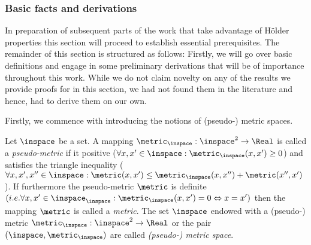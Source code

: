 


\subsubsection{Basic facts and derivations}
In preparation of subsequent parts of the work that take advantage of H\"older properties this section will proceed to establish essential prerequisites.
The remainder of this section is structured as follows: Firstly, we will go over basic definitions and engage in some preliminary derivations that will be of importance throughout this work.
While we do not claim novelty on any of the results we provide proofs for in this section, we had not found them in the literature and hence, had to derive them on our own.

Firstly, we commence with introducing the notions of (pseudo-) metric spaces.

\begin{defn}
Let $\inspace$ be a set. A mapping $\metric_\inspace: \inspace^2 \to \Real$ is called a \emph{pseudo-metric} if it positive ($\forall x,x' \in \inspace: \metric_\inspace(x,x') \geq 0$) and satisfies the triangle inequality ($\forall x,x',x'' \in \inspace: \metric(x,x') \leq \metric_\inspace(x,x'') + \metric (x'',x')$). If furthermore the pseudo-metric $\metric$ is definite $(i.e. \forall x,x' \in \inspace_\inspace: \metric_\inspace(x,x') =0 \Leftrightarrow x=x')$ then 
the mapping $\metric$ is called a \emph{metric}. The set $\inspace$ endowed with a (pseudo-) metric $\metric_\inspace: \inspace^2 \to \Real$ or the pair $(\inspace, \metric_\inspace)$ are called \emph{(pseudo-) metric space}.
 \end{defn}

